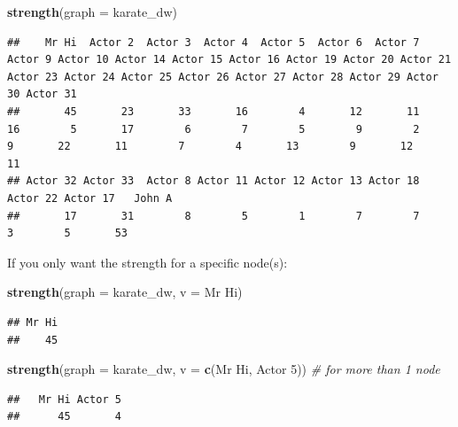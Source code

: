 \documentclass[
]{book}
\newenvironment{Shaded}{\begin{snugshade}}{\end{snugshade}}
\newcommand{\AttributeTok}[1]{\textcolor[rgb]{0.13,0.29,0.53}{#1}}
\newcommand{\CommentTok}[1]{\textcolor[rgb]{0.56,0.35,0.01}{\textit{#1}}}
\newcommand{\FunctionTok}[1]{\textcolor[rgb]{0.13,0.29,0.53}{\textbf{#1}}}
\newcommand{\NormalTok}[1]{#1}
\newcommand{\StringTok}[1]{\textcolor[rgb]{0.31,0.60,0.02}{#1}}
\begin{document}
\begin{Shaded}
\begin{Highlighting}[]
\FunctionTok{strength}\NormalTok{(}\AttributeTok{graph =}\NormalTok{ karate\_dw)}
\end{Highlighting}
\end{Shaded}

\begin{verbatim}
##    Mr Hi  Actor 2  Actor 3  Actor 4  Actor 5  Actor 6  Actor 7  Actor 9 Actor 10 Actor 14 Actor 15 Actor 16 Actor 19 Actor 20 Actor 21 Actor 23 Actor 24 Actor 25 Actor 26 Actor 27 Actor 28 Actor 29 Actor 30 Actor 31 
##       45       23       33       16        4       12       11       16        5       17        6        7        5        9        2        9       22       11        7        4       13        9       12       11 
## Actor 32 Actor 33  Actor 8 Actor 11 Actor 12 Actor 13 Actor 18 Actor 22 Actor 17   John A 
##       17       31        8        5        1        7        7        3        5       53
\end{verbatim}

If you only want the strength for a specific node(s):

\begin{Shaded}
\begin{Highlighting}[]
\FunctionTok{strength}\NormalTok{(}\AttributeTok{graph =}\NormalTok{ karate\_dw, }\AttributeTok{v =} \StringTok{\textquotesingle{}Mr Hi\textquotesingle{}}\NormalTok{)}
\end{Highlighting}
\end{Shaded}

\begin{verbatim}
## Mr Hi 
##    45
\end{verbatim}

\begin{Shaded}
\begin{Highlighting}[]
\FunctionTok{strength}\NormalTok{(}\AttributeTok{graph =}\NormalTok{ karate\_dw, }\AttributeTok{v =} \FunctionTok{c}\NormalTok{(}\StringTok{\textquotesingle{}Mr Hi\textquotesingle{}}\NormalTok{, }\StringTok{\textquotesingle{}Actor 5\textquotesingle{}}\NormalTok{)) }\CommentTok{\# for more than 1 node}
\end{Highlighting}
\end{Shaded}

\begin{verbatim}
##   Mr Hi Actor 5 
##      45       4
\end{verbatim}
\end{document}
